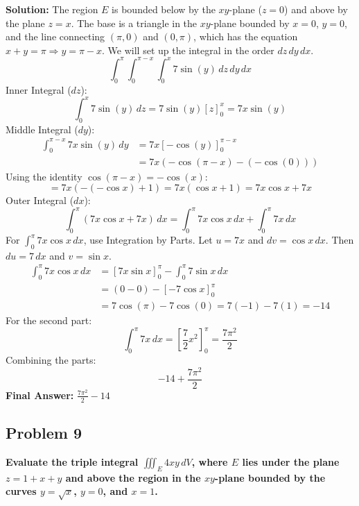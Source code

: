 \documentclass[12pt]{article}
\begin{document}
\textbf{Solution:}
The region $E$ is bounded below by the $xy$-plane ($z=0$) and above by the plane $z=x$.
The base is a triangle in the $xy$-plane bounded by $x=0$, $y=0$, and the line connecting $(\pi,0)$ and $(0,\pi)$, which has the equation $x + y = \pi \Rightarrow y = \pi - x$.
We will set up the integral in the order $dz \, dy \, dx$.
\[ \int_{0}^{\pi} \int_{0}^{\pi-x} \int_{0}^{x} 7\sin(y) \, dz \, dy \, dx \]
Inner Integral ($dz$):
\[ \int_{0}^{x} 7\sin(y) \, dz = 7\sin(y) [z]_{0}^{x} = 7x\sin(y) \]
Middle Integral ($dy$):
\begin{align*} 
\int_{0}^{\pi-x} 7x\sin(y) \, dy &= 7x \left[ -\cos(y) \right]_{0}^{\pi-x} \\
&= 7x (-\cos(\pi-x) - (-\cos(0))) 
\end{align*}
Using the identity $\cos(\pi - x) = -\cos(x)$:
\[ = 7x (- (-\cos x) + 1) = 7x(\cos x + 1) = 7x\cos x + 7x \]
Outer Integral ($dx$):
\[ \int_{0}^{\pi} (7x\cos x + 7x) \, dx = \int_{0}^{\pi} 7x\cos x \, dx + \int_{0}^{\pi} 7x \, dx \]
For $\int_{0}^{\pi} 7x\cos x \, dx$, use Integration by Parts. Let $u=7x$ and $dv=\cos x \, dx$. Then $du=7 \, dx$ and $v=\sin x$.
\begin{align*} 
\int_{0}^{\pi} 7x\cos x \, dx &= \left[ 7x\sin x \right]_{0}^{\pi} - \int_{0}^{\pi} 7\sin x \, dx \\
&= (0 - 0) - \left[ -7\cos x \right]_{0}^{\pi} \\
&= 7\cos(\pi) - 7\cos(0) = 7(-1) - 7(1) = -14
\end{align*}
For the second part:
\[ \int_{0}^{\pi} 7x \, dx = \left[ \frac{7}{2}x^2 \right]_{0}^{\pi} = \frac{7\pi^2}{2} \]
Combining the parts:
\[ -14 + \frac{7\pi^2}{2} \]
\textbf{Final Answer:} $\frac{7\pi^2}{2} - 14$

\vspace{0.5cm}
\subsection*{Problem 9}
\textbf{Evaluate the triple integral $\iiint_E 4xy \, dV$, where $E$ lies under the plane $z = 1 + x + y$ and above the region in the $xy$-plane bounded by the curves $y = \sqrt{x}$, $y = 0$, and $x = 1$.}
\end{document}
